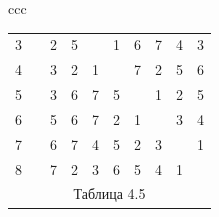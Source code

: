 \begin{center}
\begin{tabular}{ccc}
\begin{tabular}{cccccccccc}
3 & \vline & 2 & 5 & \ & 1 & 6 & 7 & 4 & 3 \\


4 & \vline & 3 & 2 & 1 & \ & 7 & 2 & 5 & 6 \\


5 & \vline & 3 & 6 & 7 & 5 & \ & 1 & 2 & 5 \\


6 & \vline & 5 & 6 & 7 & 2 & 1 & \ & 3 & 4 \\


7 & \vline & 6 & 7 & 4 & 5 & 2 & 3 & \ & 1 \\


8 & \vline & 7 & 2 & 3 & 6 & 5 & 4 & 1 & \ \\


\multicolumn{10}{c}{ Таблица 4.5}


\end{tabular}





\end{tabular}


\end{center}


\smallskip







